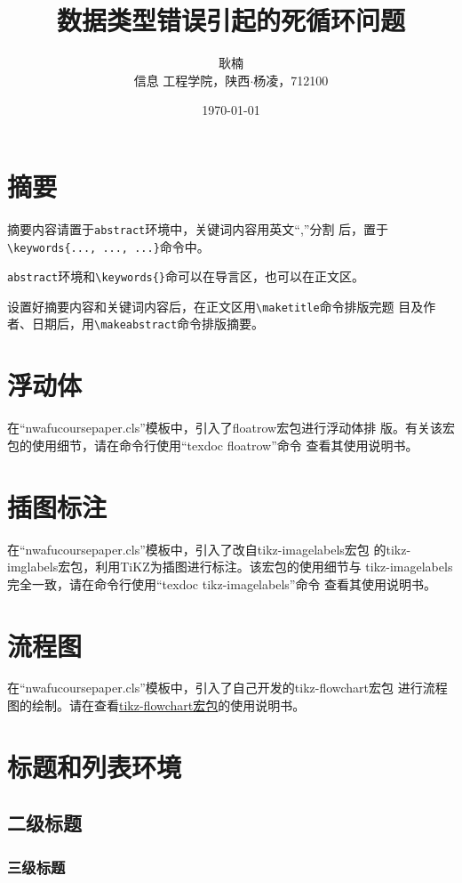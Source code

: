 \documentclass{nwafucoursepaper}
\title{\bfseries\sffamily 数据类型错误引起的死循环问题}
\author{\zihao{4} \fangsong 耿楠\\\small \songti 信息
  工程学院，陕西$\cdot$杨凌，712100}
\date{\today}
\begin{document}
\maketitle
\thispagestyle{empty}
\makeabstract

\section{摘要}
摘要内容请置于\verb|abstract|环境中，关键词内容用英文\enquote{,}分割
后，置于\verb|\keywords{..., ..., ...}|命令中。

\verb|abstract|环境和\verb|\keywords{}|命可以在导言区，也可以在正文区。

设置好摘要内容和关键词内容后，在正文区用\verb|\maketitle|命令排版完题
目及作者、日期后，用\verb|\makeabstract|命令排版摘要。
\section{浮动体}
在\enquote{nwafucoursepaper.cls}模板中，引入了floatrow宏包进行浮动体排
版。有关该宏包的使用细节，请在命令行使用\enquote{texdoc floatrow}命令
查看其使用说明书。
\section{插图标注}
在\enquote{nwafucoursepaper.cls}模板中，引入了改自tikz-imagelabels宏包
的tikz-imglabels宏包，利用TiKZ为插图进行标注。该宏包的使用细节与
tikz-imagelabels完全一致，请在命令行使用\enquote{texdoc tikz-imagelabels}命令
查看其使用说明书。
\section{流程图}
在\enquote{nwafucoursepaper.cls}模板中，引入了自己开发的tikz-flowchart宏包
进行流程图的绘制。请在\github{}查看\href{https://github.com/registor/tikz-flowchart}{tikz-flowchart宏包}的使用说明书。
\section{标题和列表环境}
\subsection{二级标题}
\subsubsection{三级标题}
\zhlipsum[1]
\end{document}
